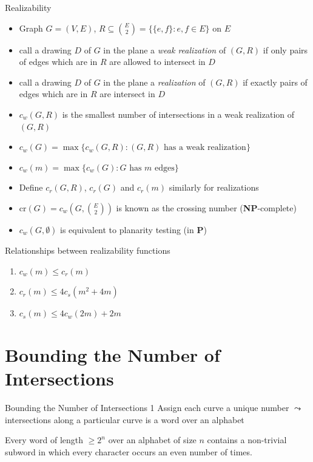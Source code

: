 \documentclass[10pt,aspectratio=169]{beamer}
\theoremstyle{plain} %
\theoremstyle{remark} %
\newcommand{\set}[1]{\{#1\}}
\begin{document}
\begin{frame}{Realizability}
    \begin{itemize}
        \item Graph \(G = (V, E)\), \(R \subseteq \binom{E}{2} = \set{\set{e, f} : e, f \in E} \) on \(E\)
        \item call a drawing \(D\) of \(G\) in the plane a \textit{weak realization} of \((G, R)\) if only pairs of edges which are in \(R\) are allowed to intersect in \(D\)
        \item call a drawing \(D\) of \(G\) in the plane a \textit{realization} of \((G, R)\) if exactly pairs of edges which are in \(R\) are intersect in \(D\)
        \item \(c_w(G, R)\) is the smallest number of intersections in a weak realization of \((G, R)\)
        \item \(c_w(G) = \max\set{c_w(G, R) : (G, R) \text{ has a weak realization}} \)
        \item \(c_w(m) = \max\set{c_w(G) : G \text{ has } m \text{ edges}}\)
        \item Define \(c_r(G, R)\), \(c_r(G)\) and \(c_r(m)\) similarly for realizations
        \item \(\mathrm{cr}(G) = c_w(G, \binom{E}{2})\) is known as the crossing number (\textbf{NP}-complete)
        \item \(c_w(G, \emptyset)\) is equivalent to planarity testing (in \textbf{P})
    \end{itemize}
\end{frame}

\begin{frame}{Relationships between realizability functions}
    \begin{lemma}
        \begin{enumerate}
            \item \(c_w(m) \leq c_r(m)\)
            \item \( c_r(m) \leq 4 c_s(m^2 + 4m) \)
            \item \(c_s(m) \leq 4 c_w(2m) + 2m\)
        \end{enumerate}
    \end{lemma}
\end{frame}

\section{Bounding the Number of Intersections}

\begin{frame}{Bounding the Number of Intersections 1}
    Assign each curve a unique number \(\leadsto\) intersections along a particular curve is a word over an alphabet
    \begin{lemma}
        Every word of length \(\geq 2^n\) over an alphabet of size \(n\) contains a non-trivial subword in which every character occurs an even number of times.
    \end{lemma}
\end{frame}
\end{document}
